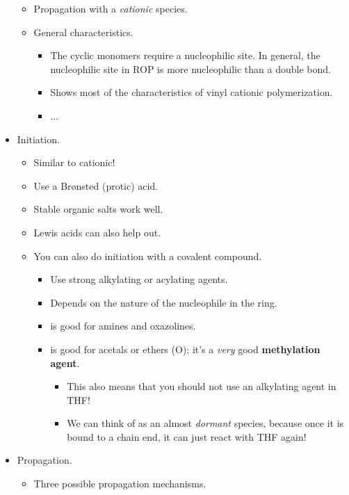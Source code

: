 \documentclass[../notes.tex]{subfiles}
\begin{document}
\begin{itemize}
\begin{itemize}
        \item Propagation with a \emph{cationic} species.
        \item General characteristics.
        \begin{itemize}
            \item The cyclic monomers require a nucleophilic site. In general, the nucleophilic site in ROP is more nucleophilic than a double bond.
            \item Shows most of the characteristics of vinyl cationic polymerization.
            \item ...
        \end{itemize}
    \end{itemize}
    \item Initiation.
    \begin{itemize}
        \item Similar to cationic!
        \item Use a Br\o nsted (protic) acid.
        \item Stable organic salts work well.
        \item Lewis acids can also help out.
        \item You can also do initiation with a covalent compound.
        \begin{itemize}
            \item Use strong alkylating or acylating agents.
            \item Depends on the nature of the nucleophile in the ring.
            \item {} is good for amines and oxazolines.
            \item {} is good for acetals or ethers (O); it's a \emph{very} good \textbf{methylation agent}.
            \begin{itemize}
                \item This also means that you should not use an alkylating agent in THF!
                \item We can think of  as an almost \emph{dormant} species, because once it is bound to a chain end, it can just react with THF again!
            \end{itemize}
        \end{itemize}
    \end{itemize}
    \item Propagation.
    \begin{itemize}
        \item Three possible propagation mechanisms.

\end{itemize}
\end{itemize}
\end{document}
